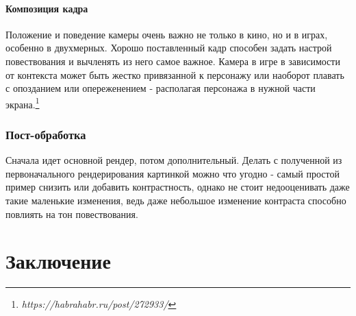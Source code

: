 \documentclass[11pt]{report}
\begin{document}
\subsection{Композиция кадра}
Положение и поведение камеры очень важно не только в кино, но и в играх, особенно в двухмерных. Хорошо поставленный кадр способен задать настрой повествования и вычленять из него самое важное. Камера в игре в зависимости от контекста может быть жестко привязанной к персонажу или наоборот плавать с опозданием или опереженением - располагая персонажа в нужной части экрана.\footnote{\emph{https://habrahabr.ru/post/272933/}}\\


\section{Пост-обработка}
Сначала идет основной рендер, потом дополнительный. Делать с полученной из первоначального рендерирования картинкой можно что угодно - самый простой пример снизить или добавить контрастность, однако не стоит недооценивать даже такие маленькие изменения, ведь даже небольшое изменение контраста способно повлиять на тон повествования.


\part{Заключение}
\end{document}
